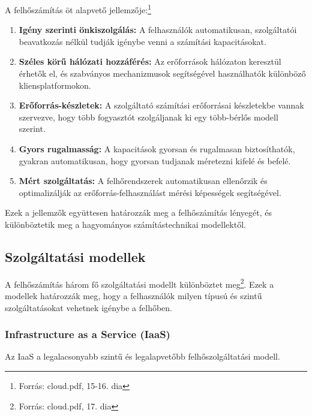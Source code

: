 \documentclass[a4paper,12pt]{article}
\begin{document}
    A felhőszámítás öt alapvető jellemzője:\footnote{Forrás: cloud.pdf, 15-16. dia}

    \begin{enumerate}
        \item \textbf{Igény szerinti önkiszolgálás:} A felhasználók automatikusan, szolgáltatói beavatkozás nélkül tudják igénybe venni a számítási kapacitásokat.

        \item \textbf{Széles körű hálózati hozzáférés:} Az erőforrások hálózaton keresztül érhetők el, és szabványos mechanizmusok segítségével használhatók különböző kliensplatformokon.

        \item \textbf{Erőforrás-készletek:} A szolgáltató számítási erőforrásai készletekbe vannak szervezve, hogy több fogyasztót szolgáljanak ki egy több-bérlős modell szerint.

        \item \textbf{Gyors rugalmasság:} A kapacitások gyorsan és rugalmasan biztosíthatók, gyakran automatikusan, hogy gyorsan tudjanak méretezni kifelé és befelé.

        \item \textbf{Mért szolgáltatás:} A felhőrendszerek automatikusan ellenőrzik és optimalizálják az erőforrás-felhasználást mérési képességek segítségével.
    \end{enumerate}

    Ezek a jellemzők együttesen határozzák meg a felhőszámítás lényegét, és különböztetik meg a hagyományos számítástechnikai modellektől.

    \subsection{Szolgáltatási modellek}

    A felhőszámítás három fő szolgáltatási modellt különböztet meg\footnote{Forrás: cloud.pdf, 17. dia}. Ezek a modellek határozzák meg, hogy a felhasználók milyen típusú és szintű szolgáltatásokat vehetnek igénybe a felhőben.

    \subsubsection{Infrastructure as a Service (IaaS)}

    Az IaaS a legalacsonyabb szintű és legalapvetőbb felhőszolgáltatási modell.
\end{document}
